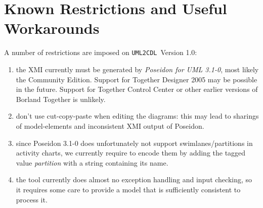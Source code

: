 \documentclass[pdftex]{scrartcl}
\newcommand{\umlToCdl}{\texttt{UML2CDL}}
\begin{document}
\section{Known Restrictions and Useful Workarounds}
A number of restrictions are imposed on \umlToCdl\ Version 1.0:
\begin{enumerate}
\item the XMI currently must be generated by \emph{Poseidon for UML
    3.1-0}, most likely the Community Edition. Support for
  Together Designer 2005 may be possible in the future.  Support for
  Together Control Center or other earlier versions of Borland
  Together is unlikely.
\item don't use cut-copy-paste when editing the diagrams: this may
  lead to sharings of model-elements and inconsistent XMI output of
  Poseidon.
\item since Poseidon 3.1-0 does unfortunately not support
  swimlanes/partitions in activity charts, we currently require to
  encode them by adding the tagged value \emph{partition} with
  a string containing its name.
\item the tool currently does almost no exception handling and input
  checking, so it requires some care to provide a model that is 
  sufficiently consistent to process it. 
\end{enumerate}



 
{\small
\sloppy

}
\end{document}
